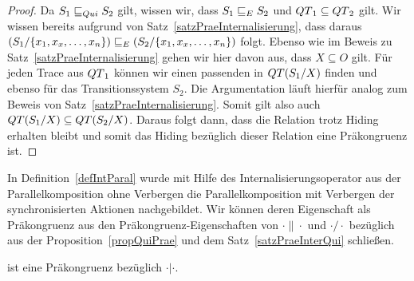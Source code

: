 \begin{proof}
  Da $S_1\sqsubseteq _{Qui} S_2$ gilt, wissen wir, dass $S_1\sqsubseteq _E S_2$ und $QT{}_1\subseteq
  QT{}_2$ gilt. Wir wissen bereits aufgrund von
  Satz~\ref{satzPraeInternalisierung}, dass daraus $(S_1/\{x_1,x_x,\dots
  ,x_n\})\sqsubseteq _E (S_2/\{x_1,x_x,\dots ,x_n\})$ folgt. Ebenso wie im Beweis zu
  Satz~\ref{satzPraeInternalisierung} gehen wir hier davon aus, dass
  $X\subseteq O$ gilt. Für jeden Trace aus $QT{}_1$ können wir einen passenden in
  $QT{}(S_1/X)$ finden und ebenso für das Transitionssystem $S_2$. Die
  Argumentation läuft hierfür analog zum Beweis von
  Satz~\ref{satzPraeInternalisierung}. Somit gilt
  also auch $QT{}(S_1/X)\subseteq QT{}(S_2/X)$. Daraus folgt dann, dass die
  Relation \QRel{} trotz Hiding erhalten bleibt und somit das Hiding bezüglich
  dieser Relation eine Präkongruenz ist.
\end{proof}

In Definition~\ref{defIntParal} wurde mit Hilfe des Internalisierungsoperator
aus der Parallelkomposition ohne Verbergen die Parallelkomposition mit
Verbergen der synchronisierten Aktionen nachgebildet. Wir können deren
Eigenschaft als Präkongruenz aus den Präkongruenz-Eigenschaften von
$\cdot\|\cdot$ und $\cdot /\cdot$ bezüglich \QRel{} aus der
Proposition~\ref{propQuiPrae} und dem Satz~\ref{satzPraeInterQui} schließen.

\begin{kor}
  \QRel{} ist eine Präkongruenz bezüglich $\cdot |\cdot$.
\end{kor}
